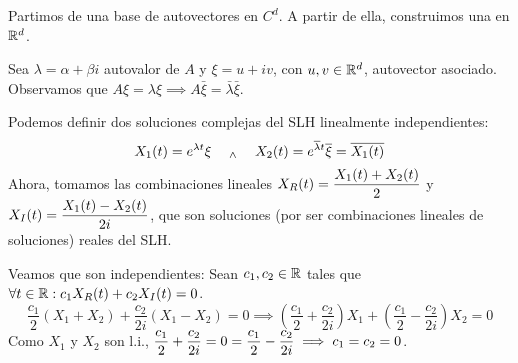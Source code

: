 Partimos de una base de autovectores en $C^d$. A partir de ella, construimos una en $\mathbb{R}^d$.

Sea $\lambda = \alpha + \beta i$ autovalor de $A$ y $\xi = u + i v$, con $u, v \in \mathbb{R}^d$, autovector asociado. Observamos que $A\xi = \lambda \xi \implies A \bar{\xi} = \bar{\lambda} \bar{\xi}$.

Podemos definir dos soluciones complejas del SLH linealmente independientes:
\[X_1(t) = e^{\lambda t} \xi \quad \; _{\wedge} \; \quad X_2(t) = e^{\overline{\lambda} t} \overline{\xi} = \overline{X_1(t)}\]
Ahora, tomamos las combinaciones lineales $\displaystyle X_R(t) =\frac{X_1(t) + X_2(t)}{2}$ y $\displaystyle X_I(t) = \frac{X_1(t) - X_2(t)}{2i}$, que son soluciones (por ser combinaciones lineales de soluciones) reales del SLH.

Veamos que son independientes: Sean $c_1, c_2 \in \mathbb{R}$ tales que $\forall t \in \mathbb{R}: c_1 X_R(t) + c_2 X_I(t) = 0$.
\[\frac{c_1}{2} \left(X_1 + X_2\right) + \frac{c_2}{2i} \left(X_1 - X_2\right) = 0 \implies \left(\frac{c_1}{2} + \frac{c_2}{2i}\right)X_1 + \left(\frac{c_1}{2} - \frac{c_2}{2i}\right)X_2 = 0\]
Como $X_1$ y $X_2$ son l.i., $\displaystyle \frac{c_1}{2} + \frac{c_2}{2i} = 0 = \frac{c_1}{2} - \frac{c_2}{2i} \implies c_1 = c_2 = 0$.

